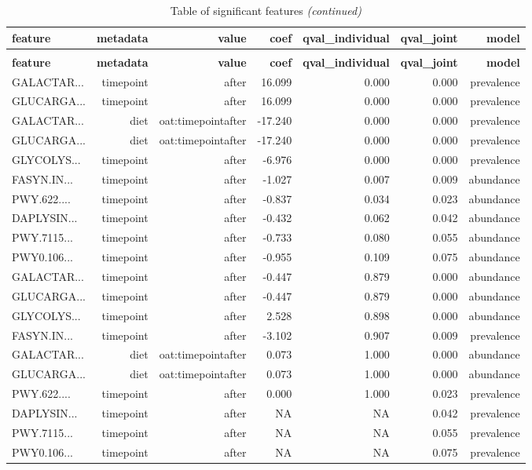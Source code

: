 \documentclass[
]{article}
\begin{document}
\begin{longtable}[t]{lrrrrrr}
\caption{Table of significant features}\\
\toprule
\textbf{feature} & \textbf{metadata} & \textbf{value} & \textbf{coef} & \textbf{qval\_individual} & \textbf{qval\_joint} & \textbf{model}\\
\midrule
\endfirsthead
\caption[]{Table of significant features \textit{(continued)}}\\
\toprule
\textbf{feature} & \textbf{metadata} & \textbf{value} & \textbf{coef} & \textbf{qval\_individual} & \textbf{qval\_joint} & \textbf{model}\\
\midrule
\endhead

\endfoot
\bottomrule
\endlastfoot
GALACTAR... & timepoint & after & 16.099 & 0.000 & 0.000 & prevalence\\
GLUCARGA... & timepoint & after & 16.099 & 0.000 & 0.000 & prevalence\\
GALACTAR... & diet & oat:timepointafter & -17.240 & 0.000 & 0.000 & prevalence\\
GLUCARGA... & diet & oat:timepointafter & -17.240 & 0.000 & 0.000 & prevalence\\
GLYCOLYS... & timepoint & after & -6.976 & 0.000 & 0.000 & prevalence\\
\addlinespace
FASYN.IN... & timepoint & after & -1.027 & 0.007 & 0.009 & abundance\\
PWY.622.... & timepoint & after & -0.837 & 0.034 & 0.023 & abundance\\
DAPLYSIN... & timepoint & after & -0.432 & 0.062 & 0.042 & abundance\\
PWY.7115... & timepoint & after & -0.733 & 0.080 & 0.055 & abundance\\
PWY0.106... & timepoint & after & -0.955 & 0.109 & 0.075 & abundance\\
\addlinespace
GALACTAR... & timepoint & after & -0.447 & 0.879 & 0.000 & abundance\\
GLUCARGA... & timepoint & after & -0.447 & 0.879 & 0.000 & abundance\\
GLYCOLYS... & timepoint & after & 2.528 & 0.898 & 0.000 & abundance\\
FASYN.IN... & timepoint & after & -3.102 & 0.907 & 0.009 & prevalence\\
GALACTAR... & diet & oat:timepointafter & 0.073 & 1.000 & 0.000 & abundance\\
\addlinespace
GLUCARGA... & diet & oat:timepointafter & 0.073 & 1.000 & 0.000 & abundance\\
PWY.622.... & timepoint & after & 0.000 & 1.000 & 0.023 & prevalence\\
DAPLYSIN... & timepoint & after & NA & NA & 0.042 & prevalence\\
PWY.7115... & timepoint & after & NA & NA & 0.055 & prevalence\\
PWY0.106... & timepoint & after & NA & NA & 0.075 & prevalence\\*
\end{longtable}
\end{document}
